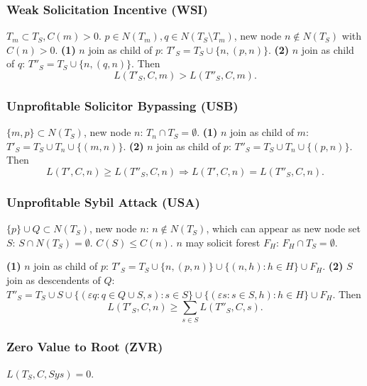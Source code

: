 \documentclass[a4paper,twocolumn,10pt]{article}
\begin{document}
	\subsubsection{Weak Solicitation Incentive (WSI)}
		$T_m\subset T_S, C(m)>0$.
		$p\in N(T_m), q\in N(T_S\setminus T_m)$,
			new node $n\notin N(T_S)$ with $C(n)>0$.
		\textbf{(1)} $n$ join as child of $p$: $T'_S=T_S\cup\{n,(p,n)\}$.
		\textbf{(2)} $n$ join as child of $q$: $T''_S=T_S\cup\{n,(q,n)\}$.
		Then
		\[
			L(T'_S,C,m) > L(T''_S,C,m).
		\]
	\subsubsection{Unprofitable Solicitor Bypassing (USB)}
		$\{m,p\}\subset N(T_S)$,
		new node $n$: $T_n\cap T_S = \emptyset$.
		\textbf{(1)} $n$ join as child of $m$: $T'_S=T_S\cup T_n\cup\{(m,n)\}$.
		\textbf{(2)} $n$ join as child of $p$: $T''_S=T_S\cup T_n\cup\{(p,n)\}$.
		Then
		\[
			L(T',C,n) \ge L(T''_S,C,n)
			\Longrightarrow
			L(T',C,n) = L(T''_S,C,n).
		\]
	\subsubsection{Unprofitable Sybil Attack (USA)}
		$\{p\}\cup Q \subset N(T_S)$,
		new node $n$: $n\notin N(T_S)$,
		which can appear as new node set $S$: $S\cap N(T_S)=\emptyset$.
		$C(S)\le C(n)$.
		$n$ may solicit forest $F_H$: $F_H\cap T_S=\emptyset$.

		\textbf{(1)} $n$ join as child of $p$:
			$T'_S=T_S\cup\{n,(p,n)\}\cup\{(n,h):h\in H\}\cup F_H$.
		\textbf{(2)} $S$ join as descendents of $Q$:
			$T''_S=T_S\cup S\cup\{(\varepsilon q:q\in Q\cup S, s): s\in S\}
			\cup \{(\varepsilon s:s\in S,h): h\in H\} \cup F_H$.
		Then
		\[
			L(T'_S,C,n) \ge \sum_{s\in S} L(T''_S,C,s).
		\]
	\subsubsection{Zero Value to Root (ZVR)}
		$L(T_S,C,Sys)=0$.
		
\end{document}
